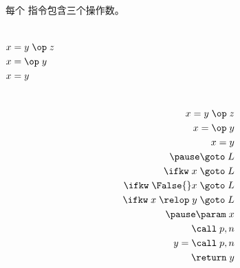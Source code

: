
\begin{frame}{}
  \begin{center}
    \begin{definition}
      每个  指令包含三个操作数。
    \end{definition}

    \begin{columns}
        \begin{align}
          x &= y \;\op\; z \\
          x &= \op\; y \\
          x &= y
        \end{align}
    \end{columns}
    \begin{align}
      x = y \;\op\; z \\
      x = \op\; y \\
      x = y \\
      \pause
      \goto\; L \\
      \ifkw\; x \;\goto\; L \\
      \ifkw\; \False{} x \;\goto\; L \\
      \ifkw\; x \;\relop\; y \;\goto\; L \\
      \pause
      \param\; x \\
      \call\; p, n \\
      y = \call\; p, n \\
      \return\; y
    \end{align}
  \end{center}
\end{frame}

\begin{frame}{}
  \begin{center}
  \end{center}
\end{frame}

\begin{frame}{}
  \begin{center}
  \end{center}
\end{frame}

\begin{frame}{}
  \begin{center}
  \end{center}
\end{frame}

\begin{frame}{}
  \begin{center}
  \end{center}
\end{frame}

\begin{frame}{}
  \begin{center}
  \end{center}
\end{frame}
